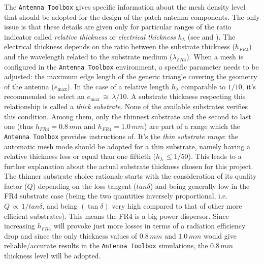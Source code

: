 \documentclass[10 pt,a4paper,twocolumn]{article}
\begin{document}
{	%

The \texttt{\color{Mahogany}Antenna Toolbox} gives specific
information about the mesh density level that should be adopted for the design of the patch antenna components. The only issue is that these details are given only for particular ranges of the ratio indicator called \emph{relative thickness} or \emph{electrical thickness} $h_{\lambda}$ (see \textbf{\cite{makarov}} and \textbf{\cite{meshing}}). The electrical thickness depends on the ratio between the substrate thickness ($h_{FR4}$) and the wavelength related to the substrate medium ($\lambda_{FR4}$). When a mesh is configured in the \texttt{\color{Mahogany}Antenna Toolbox} environment, a specific parameter needs to be adjusted: the maximum edge length of the generic triangle covering the geometry of the antenna ($e_{\max}$). In the case of a relative length $h_\lambda$ comparable to $1/10$, it's recommended to select an $e_{\max}\,\cong\,\lambda/10$. A substrate thickness respecting this relationship is called a \emph{thick substrate}. None of the available substrates verifies this condition. Among them, only the thinnest substrate and the second to last one (thus $h_{FR4}=0.8\,mm$ and $h_{FR4}=1.0\,mm$) are part of a range which the \texttt{\color{Mahogany}Antenna Toolbox} provides instructions of. It's the \emph{thin substrate range}: the automatic mesh mode should be adopted for a thin substrate, namely having a relative thickness less or equal than one fiftieth ($h_\lambda\,\leq{1/50}$). This leads to a further explanation about the actual substrate thickness chosen for this project. The thinner substrate choice rationale starts with the consideration of its quality factor ($Q$) depending on the loss tangent ($tan\delta$) and being generally low in the FR4 substrate case (being the two quantities inversely proportional, i.e. $Q\,\propto\,1/tan\delta$, and being $(\tan\delta)$ very high compared to that of other more efficient substrates). This means the FR4 is a big power dispersor. Since increasing $h_{FR4}$ will provoke just more losses in terms of a radiation efficiency drop and since the only thickness values of $0.8\,mm$ and $1.0\,mm$ would give reliable/accurate results in the \texttt{\color{Mahogany}Antenna Toolbox} simulations, the $0.8\,mm$ thickness level will be adopted. 
}
\end{document}
